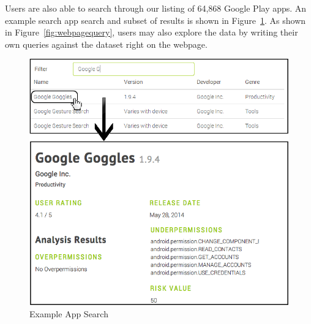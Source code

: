 \documentclass{sig-alternate-05-2015}
\begin{document}
Users are also able to search through our listing of 64,868 Google Play apps. An example search app search and subset of results is shown in Figure~\ref{fig:appSearch_all}. As shown in Figure~\ref{fig:webpagequery}, users may also explore the data by writing their own queries against the dataset right on the webpage.




%




 \begin{figure}[h]
\centering
\includegraphics[width=0.98\columnwidth, angle = 0]{images/Google_Googles_ICSE.png}
\caption{Example App Search}
\label{fig:appSearch_all}
\end{figure}



%
%
\end{document}
